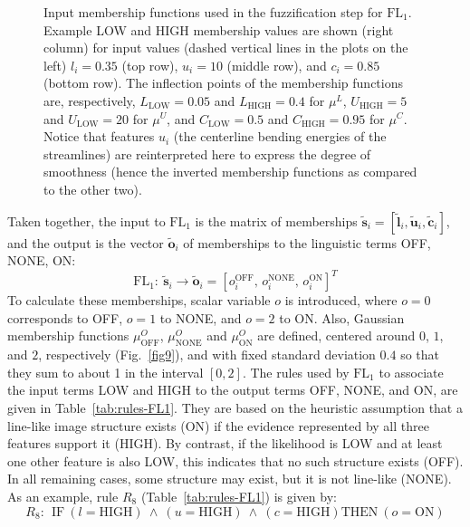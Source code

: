 \begin{figure}
	\caption{Input membership functions used in the fuzzification step for $\textrm{FL}_{1}$. Example LOW and HIGH membership values are shown (right column) for input values (dashed vertical lines in the plots on the left) $l_{i}=0.35$ (top row), $u_{i}=10$ (middle row), and $c_{i}=0.85$ (bottom row). The inflection points of the membership functions are, respectively, $L_{\textrm{LOW}}=0.05$ and $L_{\textrm{HIGH}}=0.4$ for $\mu^{L}$, $U_{\textrm{HIGH}}=5$ and $U_{\textrm{LOW}}=20$ for $\mu^{U}$, and $C_{\textrm{LOW}}=0.5$ and $C_{\textrm{HIGH}}=0.95$ for $\mu^{C}$. Notice that features $u_{i}$ (the centerline bending energies of the streamlines) are reinterpreted here to express the degree of smoothness (hence the inverted membership functions as compared to the other two).}
	\label{fig7}
\end{figure}
Taken together, the input to $\textrm{FL}_{1}$ is the matrix of memberships $\tilde{\mathbf{s}}_{i}=[\tilde{\mathbf{l}}_{i},\tilde{\mathbf{u}}_{i},\tilde{\mathbf{c}}_{i}]$, and the output is the vector $\tilde{\mathbf{o}}_{i}$ of memberships to the linguistic terms OFF, NONE, ON:
\begin{equation}
\mathrm{FL}_{1}\!:\ \tilde{\mathbf{s}}_{i} \rightarrow \tilde{\mathbf{o}}_{i} = \left[o_{i}^{\textrm{OFF}}\!,\, o_{i}^{\textrm{NONE}}\!,\, o_{i}^{\textrm{ON}}\right]^T
\label{eq:FL1}
\end{equation}
To calculate these memberships, scalar variable $o$ is introduced, where $o=0$ corresponds to OFF, $o=1$ to NONE, and $o=2$ to ON. Also, Gaussian membership functions $\mu_{\textrm{OFF}}^{O}$, $\mu_{\textrm{NONE}}^{O}$ and $\mu_{\textrm{ON}}^{O}$  are defined, centered around $0$, $1$, and $2$, respectively (Fig.~\ref{fig9}), and with fixed standard deviation $0.4$ so that they sum to about 1 in the interval $[0,2]$. The rules used by $\textrm{FL}_{1}$ to associate the input terms LOW and HIGH to the output terms OFF, NONE, and ON, are given in Table~\ref{tab:rules-FL1}. They are based on the heuristic assumption that a line-like image structure exists (ON) if the evidence represented by all three features support it (HIGH). By contrast, if the likelihood is LOW and at least one other feature is also LOW, this indicates that no such structure exists (OFF). In all remaining cases, some structure may exist, but it is not line-like (NONE). As an example, rule $R_8$ (Table~\ref{tab:rules-FL1}) is given by:
\begin{equation}
R_8\!:\ \ \textrm{IF}\ (l=\textrm{HIGH})\ \wedge\ (u=\textrm{HIGH})\ \wedge\ (c=\textrm{HIGH}) \textrm{THEN}\ (o = \textrm{ON})
\end{equation}
